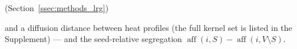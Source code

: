     (Section~\ref{ssec:methods_lrg})

    and a diffusion distance between heat profiles (the full kernel set is listed in the Supplement) --- and the seed-relative segregation \(\operatorname{aff}(i,S)-\operatorname{aff}(i,V\setminus S)\).



%

